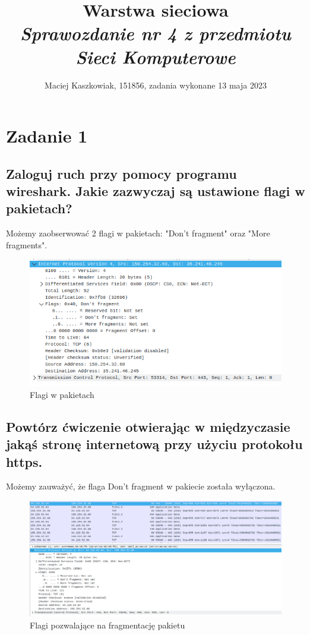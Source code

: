 \documentclass[polish, a4paper]{article}
\title{Warstwa sieciowa \\
        \Large \emph{Sprawozdanie nr 4 z przedmiotu Sieci Komputerowe}}
\author{Maciej Kaszkowiak, 151856, zadania wykonane 13 maja 2023}
\date{\vspace{-5ex}} %
\begin{document}
\maketitle

\tableofcontents

\newpage

\section{Zadanie 1}
\subsection{Zaloguj ruch przy pomocy programu wireshark. Jakie zazwyczaj są ustawione flagi w pakietach?}

Możemy zaobserwować 2 flagi w pakietach: "Don't fragment" oraz "More fragments".
\begin{figure}[H]
\centering
\includegraphics[width=\textwidth]{flagi.png}
\caption{Flagi w pakietach}
\end{figure}


\subsection{Powtórz ćwiczenie otwierając w międzyczasie jakąś stronę internetową przy użyciu protokołu https.}

Możemy zauważyć, że flaga Don't fragment w pakiecie została wyłączona.

\begin{figure}[H]
\centering
\includegraphics[width=\textwidth]{flagi 2.png}
\caption{Flagi pozwalające na fragmentację pakietu}
\end{figure}
\end{document}
